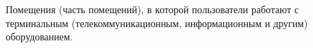 Помещения (часть помещений), в которой пользователи работают с
терминальным (телекоммуникационным, информационным и другим)
оборудованием.